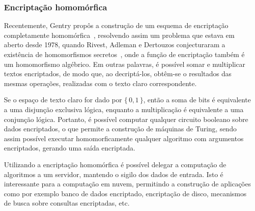 \documentclass{SBCbookchapter}
\newcommand{\Set}[1]{\{\,#1\,\}}
\begin{document}
\begin{otherlanguage}{brazilian}
\subsubsection{Encriptação homomórfica}

Recentemente, Gentry propôs a construção de um esquema de encriptação completamente homomórfica~\cite{gentry}, resolvendo assim um problema que estava em aberto desde 1978, quando Rivest, Adleman e Dertouzos conjecturaram a existência de homomorfismos secretos~\cite{minicursoFHE}, onde a função de encriptação também é um homomorfismo algébrico. Em outras palavras, é possível somar e multiplicar textos encriptados, de modo que, ao decriptá-los, obtêm-se o resultados das mesmas operações, realizadas com o texto claro correspondente. 

Se o espaço de texto claro for dado por $\Set{0,1}$, então a soma de bits é equivalente a uma disjunção exclusiva lógica, enquanto a multiplicação é equivalente a uma conjunção lógica. Portanto, é possível computar qualquer circuito booleano sobre dados encriptados, o que permite a construção de máquinas de Turing, sendo assim possível executar homomorficamente qualquer algoritmo com argumentos encriptados, gerando uma saída encriptada. 

Utilizando a encriptação homomórfica é possível delegar a computação de algoritmos a um servidor, mantendo o sigilo dos dados de entrada. Isto é interessante para a computação em nuvem, permitindo a construção de aplicações como por exemplo banco de dados encriptado, encriptação de disco, mecanismos de busca sobre consultas encriptadas, etc. 




\end{otherlanguage}
\end{document}
